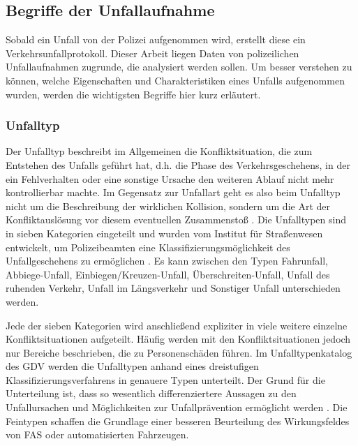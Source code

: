 \subsection{Begriffe der Unfallaufnahme}\label{subsection:Begriffe der Unfallaufnahme}
Sobald ein Unfall von der Polizei aufgenommen wird, erstellt diese ein Verkehrsunfallprotokoll. Dieser Arbeit liegen Daten von polizeilichen Unfallaufnahmen zugrunde, die analysiert werden sollen. Um besser verstehen zu können, welche Eigenschaften und Charakteristiken eines Unfalls aufgenommen wurden, werden die wichtigsten Begriffe hier kurz erläutert.

\subsubsection{Unfalltyp}
Der Unfalltyp beschreibt im Allgemeinen die Konfliktsituation, die zum Entstehen des Unfalls geführt hat, d.h. die Phase des Verkehrsgeschehens, in der ein Fehlverhalten oder eine sonstige Ursache den weiteren Ablauf nicht mehr kontrollierbar machte. Im Gegensatz zur Unfallart geht es also beim Unfalltyp nicht um die Beschreibung der wirklichen Kollision, sondern um die Art der Konfliktauslösung vor diesem eventuellen Zusammenstoß \parencite[S. 16]{StatistischesBundesamt.2018b}. Die Unfalltypen sind in sieben Kategorien eingeteilt und wurden vom Institut für Straßenwesen entwickelt, um Polizeibeamten eine Klassifizierungsmöglichkeit des Unfallgeschehens zu ermöglichen \parencite[S. 16]{Gschwendtner.2015}. Es kann zwischen den Typen Fahrunfall, Abbiege-Unfall, Einbiegen/Kreuzen-Unfall, Überschreiten-Unfall, Unfall des ruhenden Verkehr, Unfall im Längsverkehr und Sonstiger Unfall unterschieden werden.

Jede der sieben Kategorien wird anschließend expliziter in viele weitere einzelne Konfliktsituationen aufgeteilt. Häufig werden mit den Konfliktsituationen jedoch nur Bereiche beschrieben, die zu Personenschäden führen. Im Unfalltypenkatalog des \ac{GDV} werden die Unfalltypen anhand eines dreistufigen Klassifizierungsverfahrens in genauere Typen unterteilt. Der Grund für die Unterteilung ist, dass so wesentlich differenziertere Aussagen zu den Unfallursachen und Möglichkeiten zur Unfallprävention ermöglicht werden \parencite[S. 106]{Grundl.2005}. Die Feintypen schaffen die Grundlage einer besseren Beurteilung des Wirkungsfeldes von \ac{FAS} oder automatisierten Fahrzeugen.

